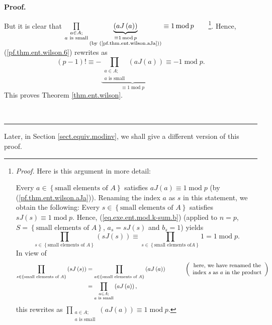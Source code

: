 \documentclass[numbers=enddot,12pt,final,onecolumn,notitlepage]{scrartcl}%
\numberwithin{exer}{subsection}
\theoremstyle{definition}
\newenvironment{fineprint}{\begin{small}}{\end{small}}
\newenvironment{proof}[1][Proof]{\noindent\textbf{#1.} }{\ \rule{0.5em}{0.5em}}
\let\prodnonlimits\prod
\renewcommand{\prod}{\prodnonlimits\limits}
\begin{document}
\begin{proof}
\begin{fineprint}
But it is clear that $\prod_{\substack{a\in A;\\a\text{ is small}%
}}\underbrace{\left(  aJ\left(  a\right)  \right)  }_{\substack{\equiv
1\operatorname{mod}p\\\text{(by (\ref{pf.thm.ent.wilson.aJa}))}}%
}\equiv1\operatorname{mod}p$\ \ \ \ \footnote{\textit{Proof.} Here is this
argument in more detail:
\par
Every $a\in\left\{  \text{small elements of }A\right\}  $ satisfies $aJ\left(
a\right)  \equiv1\operatorname{mod}p$ (by (\ref{pf.thm.ent.wilson.aJa})).
Renaming the index $a$ as $s$ in this statement, we obtain the following:
Every $s\in\left\{  \text{small elements of }A\right\}  $ satisfies $sJ\left(
s\right)  \equiv1\operatorname{mod}p$. Hence, (\ref{eq.exe.ent.mod.k-sum.b})
(applied to $n=p$, $S=\left\{  \text{small elements of }A\right\}  $,
$a_{s}=sJ\left(  s\right)  $ and $b_{s}=1$) yields
\[
\prod_{s\in\left\{  \text{small elements of }A\right\}  }\left(  sJ\left(
s\right)  \right)  \equiv\prod_{s\in\left\{  \text{small elements of
}A\right\}  }1=1\operatorname{mod}p.
\]
In view of%
\begin{align*}
\prod_{s\in\left\{  \text{small elements of }A\right\}  }\left(  sJ\left(
s\right)  \right)   &  =\prod_{a\in\left\{  \text{small elements of
}A\right\}  }\left(  aJ\left(  a\right)  \right)  \ \ \ \ \ \ \ \ \ \ \left(
\begin{array}
[c]{c}%
\text{here, we have renamed the}\\
\text{index }s\text{ as }a\text{ in the product}%
\end{array}
\right) \\
&  =\prod_{\substack{a\in A;\\a\text{ is small}}}\left(  aJ\left(  a\right)
\right)  ,
\end{align*}
this rewrites as $\prod_{\substack{a\in A;\\a\text{ is small}}}\left(
aJ\left(  a\right)  \right)  \equiv1\operatorname{mod}p$.}. Hence,
(\ref{pf.thm.ent.wilson.6}) rewrites as%
\[
\left(  p-1\right)  !\equiv-\underbrace{\prod_{\substack{a\in A;\\a\text{ is
small}}}\left(  aJ\left(  a\right)  \right)  }_{\equiv1\operatorname{mod}%
p}\equiv-1\operatorname{mod}p.
\]
This proves Theorem \ref{thm.ent.wilson}.
\end{fineprint}
\end{proof}

Later, in Section \ref{sect.equiv.modinv}, we shall give a different version
of this proof.
\end{document}
